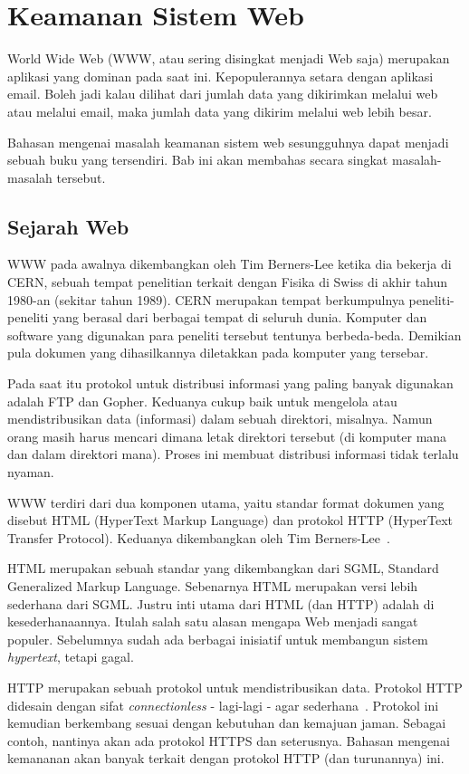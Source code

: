 \chapter{Keamanan Sistem Web}
World Wide Web (WWW, atau sering disingkat menjadi Web saja) merupakan aplikasi
yang dominan pada saat ini. Kepopulerannya setara dengan aplikasi email. Boleh
jadi kalau dilihat dari jumlah data yang dikirimkan melalui web atau melalui
email, maka jumlah data yang dikirim melalui web lebih besar.

Bahasan mengenai masalah keamanan sistem web sesungguhnya dapat menjadi sebuah
buku yang tersendiri. Bab ini akan membahas secara singkat masalah-masalah
tersebut.

\section{Sejarah Web}
WWW pada awalnya dikembangkan oleh Tim Berners-Lee ketika dia bekerja di CERN,
sebuah tempat penelitian terkait dengan Fisika di Swiss di akhir tahun 1980-an
(sekitar tahun 1989).
CERN merupakan tempat berkumpulnya peneliti-peneliti yang berasal dari berbagai
tempat di seluruh dunia. Komputer dan software yang digunakan para peneliti
tersebut tentunya berbeda-beda. Demikian pula dokumen yang dihasilkannya
diletakkan pada komputer yang tersebar.

Pada saat itu protokol untuk distribusi informasi yang paling banyak digunakan
adalah FTP dan Gopher. Keduanya cukup baik untuk mengelola atau
mendistribusikan data (informasi) dalam sebuah direktori, misalnya. Namun orang
masih harus mencari dimana letak direktori tersebut (di komputer mana dan dalam
direktori mana). Proses ini membuat distribusi informasi tidak terlalu nyaman.

WWW terdiri dari dua komponen utama, yaitu standar format dokumen yang
disebut HTML (HyperText Markup Language) dan protokol HTTP (HyperText Transfer
Protocol). Keduanya dikembangkan oleh Tim Berners-Lee~\cite{webbook}.

HTML merupakan sebuah standar yang dikembangkan dari SGML, Standard Generalized
Markup Language. Sebenarnya HTML merupakan versi lebih sederhana dari SGML.
Justru inti utama dari HTML (dan HTTP) adalah di kesederhanaannya. Itulah
salah satu alasan mengapa Web menjadi sangat populer. Sebelumnya sudah ada
berbagai inisiatif untuk membangun sistem {\em hypertext}, tetapi gagal.

HTTP merupakan sebuah protokol untuk mendistribusikan data.  Protokol HTTP
didesain dengan sifat {\em connectionless} - lagi-lagi - agar
sederhana~\cite{RFC2068}. Protokol ini kemudian berkembang sesuai dengan
kebutuhan dan kemajuan jaman. Sebagai contoh, nantinya akan ada protokol HTTPS
dan seterusnya. Bahasan mengenai kemananan akan banyak terkait dengan protokol
HTTP (dan turunannya) ini.

